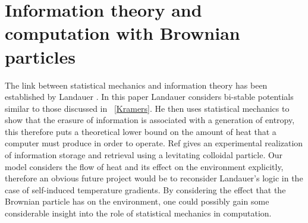\section{Information theory and computation with Brownian particles}
The link between statistical mechanics and information theory has been established by Landauer \cite{Landauer1961}. In this paper Landauer considers bi-stable potentials similar to those discussed in ~\autoref{Kramers}. He then uses statistical mechanics to show that the erasure of information is associated with a generation of entropy, this therefore puts a theoretical lower bound on the amount of heat that a computer must produce in order to operate. Ref \cite{MyersCelebranoKrishnan2015} gives an experimental realization of information storage and retrieval using a levitating colloidal particle. Our model considers the flow of heat and its effect on the environment explicitly, therefore an obvious future project would be to reconsider Landauer's logic in the case of self-induced temperature gradients. By considering the effect that the Brownian particle has on the environment, one could possibly gain some considerable insight into the role of statistical mechanics in computation.
